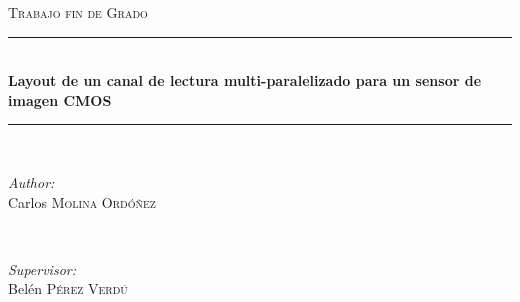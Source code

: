 
\begin{titlepage}

\newcommand{\HRule}{\rule{\linewidth}{0.5mm}} %

\center %


\textsc{\LARGE Trabajo fin de Grado}\\[1.5cm] %






\HRule \\[0.4cm]
{ \large \bfseries Layout de un canal de lectura multi-paralelizado \newline para un sensor de imagen CMOS}\\[0.4cm] %
\HRule \\[1.5cm]


\begin{minipage}{0.4\textwidth}
\begin{flushleft} \large
\emph{Author:}\\
Carlos \textsc{Molina Ordóñez} %
\end{flushleft}
\end{minipage}
~
\begin{minipage}{0.4\textwidth}
\begin{flushright} \large
\emph{Supervisor:} \\
Belén \textsc{Pérez Verdú} %
\end{flushright}
\end{minipage}\\[2cm]


\end{titlepage}
